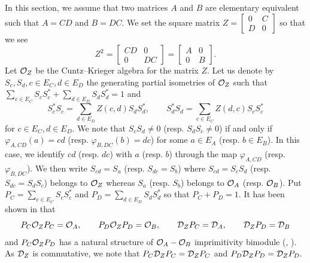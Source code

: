 \documentclass[11pt]{article}
\theoremstyle{plain}
\theoremstyle{definition}
\numberwithin{equation}{section}
\begin{document}
In this section, 
we assume that two matrices $A$ and $B$ are elementary equivalent
such that
$A =CD$ and $B = DC$.
We set the square matrix
$Z =
\begin{bmatrix}
0 & C \\
D & 0
\end{bmatrix}
$
so that we see
\begin{equation*}
Z^2 =
\begin{bmatrix}
CD & 0 \\
0 & DC
\end{bmatrix}
=
\begin{bmatrix}
A & 0 \\
0 & B
\end{bmatrix}.
\end{equation*}
Let ${{\mathcal{O}}_Z}$ be the Cuntz--Krieger algebra for the matrix $Z$.
Let us denote by
$ S_c, S_d, c \in E_C, d \in E_D$ 
the generating partial isometries of ${{\mathcal{O}}_Z}$
such that 
$
\sum_{c \in E_C} S_c S_c^*
+
\sum_{d \in E_D} S_d S_d^*
=1$
and
\begin{equation*}
S_c^* S_c = \sum_{d \in E_D}Z(c,d) S_d S_d^*, \qquad
S_d^* S_d = \sum_{c \in E_C}Z(d,c) S_c S_c^*
\end{equation*}
for $c \in E_C, d \in E_D$.
We note that 
$S_c S_d \ne 0$ 
(resp. $S_d S_c \ne 0$) 
if and only if 
$\varphi_{A,CD}(a) = cd$
(resp.
$\varphi_{B,DC}(b) = dc$)
 for some $a \in E_A$
(resp. $b \in E_B$).
In this case, we identify 
$cd$ (resp. $dc$) 
with $a$ (resp. $b$)
through the map 
$\varphi_{A,CD}$
(resp. $\varphi_{B,DC}$).
We then write
$S_{cd} = S_a$
(resp. $S_{dc} = S_b$)
where $S_{cd} = S_c S_d$ (resp. $S_{dc} = S_d S_c$)
belongs to ${{\mathcal{O}}_Z}$
whereas 
$S_a$ (resp. $S_b$) belongs to ${{\mathcal{O}}_A}$ (resp. ${{\mathcal{O}}_B}$).
Put
$P_C = \sum_{c \in E_C} S_c S_c^*$
and
$P_D = \sum_{d \in E_D} S_d S_d^*$
so that $P_C + P_D =1$.
It has been shown in \cite{MaETDS2004}
that 
\begin{equation}
P_C {{\mathcal{O}}_Z} P_C = {{\mathcal{O}}_A}, \qquad P_D {{\mathcal{O}}_Z} P_D = {{\mathcal{O}}_B},\qquad
 {{\mathcal{D}}_Z} P_C = {{\mathcal{D}}_A}, \qquad  {{\mathcal{D}}_Z} P_D = {{\mathcal{D}}_B}
\end{equation}
and 
$P_C {{\mathcal{O}}_Z} P_D$ has a natural structure of 
${{\mathcal{O}}_A}-{{\mathcal{O}}_B}$ imprimitivity bimodule (\cite{Rieffel1}, \cite{Rieffel2}).
As ${{\mathcal{D}}_Z}$ is commutative, we note that
$
P_C {{\mathcal{D}}_Z} P_C ={{\mathcal{D}}_Z} P_C
$
and
$P_D {{\mathcal{D}}_Z} P_D ={{\mathcal{D}}_Z} P_D.
$
\end{document}
